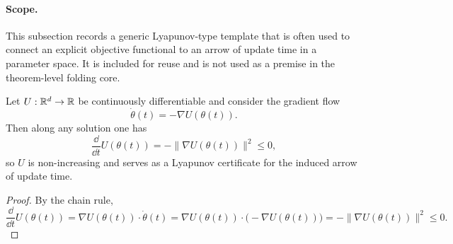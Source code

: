 \paragraph{Scope.}
\AuditTag This subsection records a generic Lyapunov-type template that is often used to connect an explicit objective functional to an arrow of update time in a parameter space.
It is included for reuse and is not used as a premise in the theorem-level folding core.

\begin{proposition}\label{prop:wish_motive_generic_lyapunov}
\MathTag Let $U:\mathbb{R}^d\to\mathbb{R}$ be continuously differentiable and consider the gradient flow
\[
\dot{\theta}(t)=-\nabla U(\theta(t)).
\]
Then along any solution one has
\[
\frac{\dd}{\dd t}U(\theta(t))=-\|\nabla U(\theta(t))\|^2\le 0,
\]
so $U$ is non-increasing and serves as a Lyapunov certificate for the induced arrow of update time.
\end{proposition}

\begin{proof}
By the chain rule,
\[
\frac{\dd}{\dd t}U(\theta(t))=\nabla U(\theta(t))\cdot \dot{\theta}(t)
=\nabla U(\theta(t))\cdot\bigl(-\nabla U(\theta(t))\bigr)
=-\|\nabla U(\theta(t))\|^2\le 0.
\]
\end{proof}
